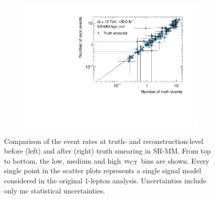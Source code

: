 \begin{figure}
\begin{subfigure}[b]{0.49\linewidth}
	\end{subfigure}\hfill
	\begin{subfigure}[b]{0.49\linewidth}
		\centering\includegraphics[width=\textwidth]{yields_SR-MM_high_mct_smeared}
	\end{subfigure}
	\caption{Comparison of the event rates at truth- and reconstruction-level before (left) and after (right) truth smearing in SR-MM. From top to bottom, the low, medium and high $m_{\textrm{CT}}$ bins are shown. Every single point in the scatter plots represents a single signal model considered in the original 1-lepton analysis. Uncertainties include only \gls{mc} statistical uncertainties.}
	\label{fig:smearing_signal_regions_2}
\end{figure}

